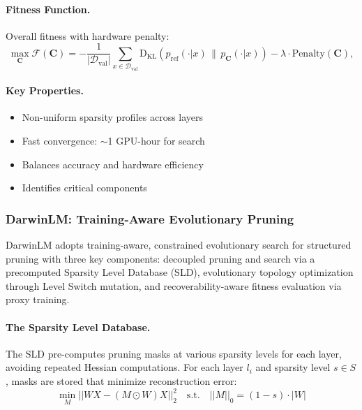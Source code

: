 \paragraph{Fitness Function.}
Overall fitness with hardware penalty:
\begin{equation}
	\max_{\mathbf{C}} \mathcal{F}(\mathbf{C}) 
	= -\frac{1}{|\mathcal{D}_{\text{val}}|}\sum_{x\in\mathcal{D}_{\text{val}}}
	\text{D}_{\text{KL}}\left(p_{\text{ref}}(\cdot|x)\,\|\,p_{\mathbf{C}}(\cdot|x)\right)
	- \lambda \cdot \text{Penalty}(\mathbf{C}),
\end{equation}

\paragraph{Key Properties.}
\begin{itemize}[nosep]
	\item Non-uniform sparsity profiles across layers
	\item Fast convergence: $\sim$1 GPU-hour for search
	\item Balances accuracy and hardware efficiency
	\item Identifies critical components
\end{itemize}

\subsubsection{DarwinLM: Training-Aware Evolutionary Pruning}

DarwinLM adopts training-aware, constrained evolutionary search for structured pruning with three key components: decoupled pruning and search via a precomputed Sparsity Level Database (SLD), evolutionary topology optimization through Level Switch mutation, and recoverability-aware fitness evaluation via proxy training.

\paragraph{The Sparsity Level Database.}
The SLD pre-computes pruning masks at various sparsity levels for each layer, avoiding repeated Hessian computations. For each layer $l_i$ and sparsity level $s \in S$, masks are stored that minimize reconstruction error:
\begin{equation}
	\min_M || WX - (M \odot W)X ||_2^2 \quad \text{s.t.} \quad ||M||_0 = (1-s) \cdot |W|
\end{equation}

